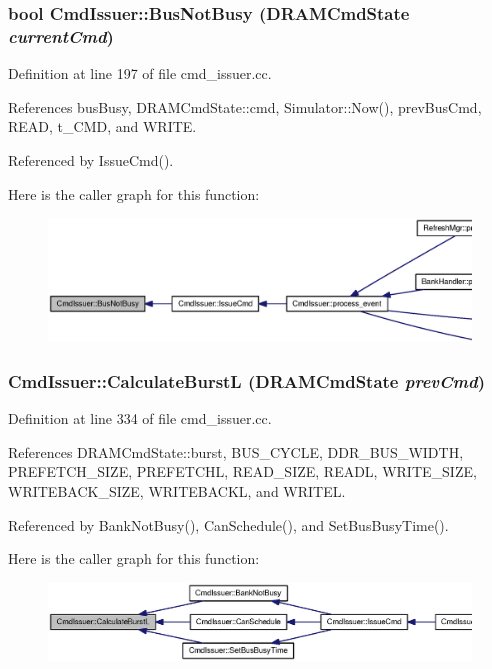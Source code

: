 \subsubsection[{BusNotBusy}]{\setlength{\rightskip}{0pt plus 5cm}bool CmdIssuer::BusNotBusy ({\bf DRAMCmdState} {\em currentCmd})}\label{classCmdIssuer_f3f2fde9bf4fd88b565f372869b724d1}




Definition at line 197 of file cmd\_\-issuer.cc.

References busBusy, DRAMCmdState::cmd, Simulator::Now(), prevBusCmd, READ, t\_\-CMD, and WRITE.

Referenced by IssueCmd().

Here is the caller graph for this function:\nopagebreak
\begin{figure}[H]
\begin{center}
\leavevmode
\includegraphics[width=420pt]{classCmdIssuer_f3f2fde9bf4fd88b565f372869b724d1_icgraph}
\end{center}
\end{figure}
\subsubsection[{CalculateBurstL}]{ CmdIssuer::CalculateBurstL ({\bf DRAMCmdState} {\em prevCmd})}\label{classCmdIssuer_4f8af3e538cf545ef379e2a4da7b8a38}




Definition at line 334 of file cmd\_\-issuer.cc.

References DRAMCmdState::burst, BUS\_\-CYCLE, DDR\_\-BUS\_\-WIDTH, PREFETCH\_\-SIZE, PREFETCHL, READ\_\-SIZE, READL, WRITE\_\-SIZE, WRITEBACK\_\-SIZE, WRITEBACKL, and WRITEL.

Referenced by BankNotBusy(), CanSchedule(), and SetBusBusyTime().

Here is the caller graph for this function:\nopagebreak
\begin{figure}[H]
\begin{center}
\leavevmode
\includegraphics[width=420pt]{classCmdIssuer_4f8af3e538cf545ef379e2a4da7b8a38_icgraph}
\end{center}
\end{figure}

